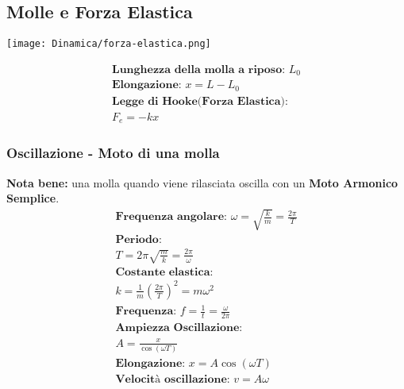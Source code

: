 \subsection{Molle e Forza Elastica}
\begin{center}
    \texttt{[image: Dinamica/forza-elastica.png]}
\end{center}
\begin{gather*}
    \textbf{Lunghezza della molla a riposo: } L_0 \\
    \textbf{Elongazione: } x = L - L_0 \\
    \textbf{Legge di Hooke(Forza Elastica): } \\ F_e = -k x
\end{gather*}
\subsubsection{Oscillazione - Moto di una molla}
\textbf{Nota bene: } una molla quando viene rilasciata oscilla con un \textbf{Moto Armonico Semplice}.
\begin{gather*}
    \textbf{Frequenza angolare: } \omega = \sqrt{\frac{k}{m}} = \frac{2 \pi}{T} \\
    \textbf{Periodo: } \\ T = 2 \pi \sqrt{\frac{m}{k}} = \frac{2 \pi}{\omega} \\
    \textbf{Costante elastica: } \\ k = \frac{1}{m} (\frac{2 \pi}{T})^2 = m \omega^2 \\
    \textbf{Frequenza: } f = \frac{1}{t} = \frac{\omega}{2 \pi} \\
    \textbf{Ampiezza Oscillazione: } \\ A = \frac{x}{\cos (\omega T)} \\
    \textbf{Elongazione: } x = A \cos (\omega T) \\
    \textbf{Velocità oscillazione: } v = A \omega
\end{gather*}
